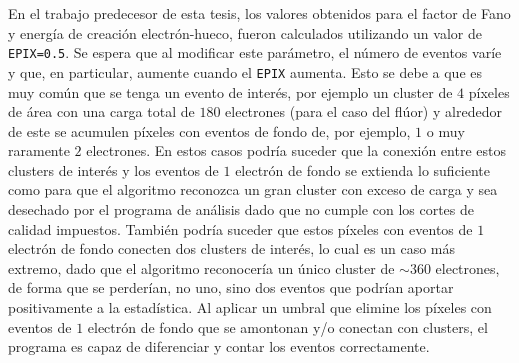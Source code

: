 En el trabajo predecesor de esta tesis\cite{TesisKevin}, los valores obtenidos para el factor de Fano y energía de creación electrón-hueco, fueron calculados utilizando un valor de \verb|EPIX=0.5|. Se espera que al modificar este parámetro, el número de eventos varíe y que, en particular, aumente cuando el \verb|EPIX| aumenta. Esto se debe a que es muy común que se tenga un evento de interés, por ejemplo un cluster de $4$ píxeles de área con una carga total de $180$ electrones (para el caso del flúor) y alrededor de este se acumulen píxeles con eventos de fondo de, por ejemplo, $1$ o muy raramente $2$ electrones. En estos casos podría suceder que la conexión entre estos clusters de interés y los eventos de $1$ electrón de fondo se extienda lo suficiente como para que el algoritmo reconozca un gran cluster con exceso de carga y sea desechado por el programa de análisis dado que no cumple con los cortes de calidad impuestos. También podría suceder que estos píxeles con eventos de $1$ electrón de fondo conecten dos clusters de interés, lo cual es un caso más extremo, dado que el algoritmo reconocería un único cluster de $\sim 360$ electrones, de forma que se perderían, no uno, sino dos eventos que podrían aportar positivamente a la estadística. Al aplicar un umbral que elimine los píxeles con eventos de $1$ electrón de fondo que se amontonan y/o conectan con clusters, el programa es capaz de diferenciar y contar los eventos correctamente.


